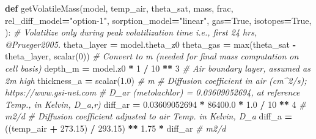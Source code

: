 \documentclass[]{article}
\newenvironment{Shaded}{\begin{snugshade}}{\end{snugshade}}
\newcommand{\KeywordTok}[1]{\textcolor[rgb]{0.13,0.29,0.53}{\textbf{{#1}}}}
\newcommand{\DecValTok}[1]{\textcolor[rgb]{0.00,0.00,0.81}{{#1}}}
\newcommand{\FloatTok}[1]{\textcolor[rgb]{0.00,0.00,0.81}{{#1}}}
\newcommand{\StringTok}[1]{\textcolor[rgb]{0.31,0.60,0.02}{{#1}}}
\newcommand{\CommentTok}[1]{\textcolor[rgb]{0.56,0.35,0.01}{\textit{{#1}}}}
\newcommand{\VariableTok}[1]{\textcolor[rgb]{0.00,0.00,0.00}{{#1}}}
\newcommand{\OperatorTok}[1]{\textcolor[rgb]{0.81,0.36,0.00}{\textbf{{#1}}}}
\newcommand{\BuiltInTok}[1]{{#1}}
\newcommand{\NormalTok}[1]{{#1}}
\begin{document}
\begin{Shaded}
\begin{Highlighting}[]
\KeywordTok{def} \NormalTok{getVolatileMass(model, temp_air, theta_sat, mass, frac,}
                    \NormalTok{rel_diff_model}\OperatorTok{=}\StringTok{"option-1"}\NormalTok{, sorption_model}\OperatorTok{=}\StringTok{"linear"}\NormalTok{,}
                    \NormalTok{gas}\OperatorTok{=}\VariableTok{True}\NormalTok{, isotopes}\OperatorTok{=}\VariableTok{True}\NormalTok{, ):}
    \CommentTok{# Volatilize only during peak volatilization time i.e., first 24 hrs, @Prueger2005.}
    \NormalTok{theta_layer }\OperatorTok{=} \NormalTok{model.theta_z0}
    \NormalTok{theta_gas }\OperatorTok{=} \BuiltInTok{max}\NormalTok{(theta_sat }\OperatorTok{-} \NormalTok{theta_layer, scalar(}\DecValTok{0}\NormalTok{))}
    \CommentTok{# Convert to m (needed for final mass computation on cell basis)}
    \NormalTok{depth_m }\OperatorTok{=} \NormalTok{model.z0 }\OperatorTok{*} \DecValTok{1} \OperatorTok{/} \DecValTok{10} \OperatorTok{**} \DecValTok{3}
    \CommentTok{# Air boundary layer, assumed as 2m high}
    \NormalTok{thickness_a }\OperatorTok{=} \NormalTok{scalar(}\FloatTok{1.0}\NormalTok{)  }\CommentTok{# m}
    \CommentTok{# Diffusion coefficient in air (cm^2/s); https://www.gsi-net.com}
    \CommentTok{#  D_ar (metolachlor) = 0.03609052694,  at reference Temp., in Kelvin, D_a,r)}
    \NormalTok{diff_ar }\OperatorTok{=} \FloatTok{0.03609052694} \OperatorTok{*} \FloatTok{86400.0} \OperatorTok{*} \FloatTok{1.0} \OperatorTok{/} \DecValTok{10} \OperatorTok{**} \DecValTok{4}  \CommentTok{# m2/d}
    \CommentTok{# Diffusion coefficient adjusted to air Temp. in Kelvin, D_a}
    \NormalTok{diff_a }\OperatorTok{=} \NormalTok{((temp_air }\OperatorTok{+} \FloatTok{273.15}\NormalTok{) }\OperatorTok{/} \FloatTok{293.15}\NormalTok{) }\OperatorTok{**} \FloatTok{1.75} \OperatorTok{*} \NormalTok{diff_ar  }\CommentTok{# m2/d}


\end{Highlighting}
\end{Shaded}
\end{document}
